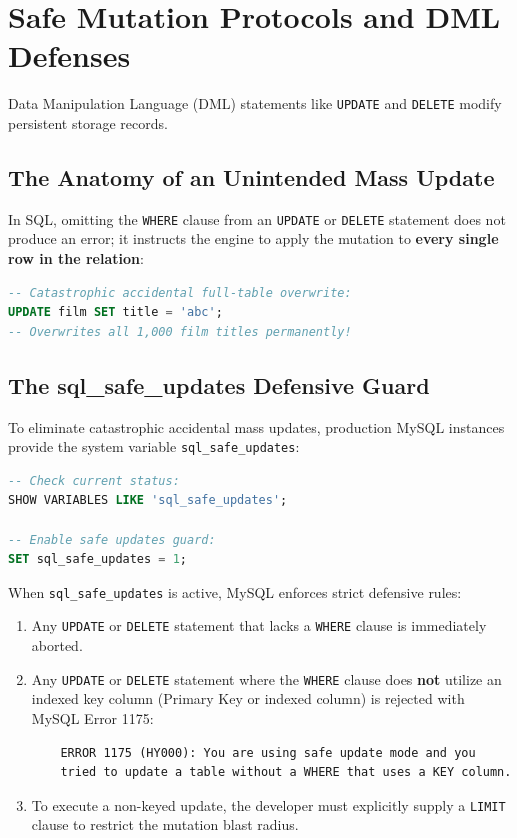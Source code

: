 \documentclass[10pt,journal,compsoc,onecolumn]{IEEEtran}
\begin{document}
\section{Safe Mutation Protocols and DML Defenses}
\label{sec:safe_mutations}

Data Manipulation Language (DML) statements like \texttt{UPDATE} and \texttt{DELETE} modify persistent storage records. 

\subsection{The Anatomy of an Unintended Mass Update}
In SQL, omitting the \texttt{WHERE} clause from an \texttt{UPDATE} or \texttt{DELETE} statement does not produce an error; it instructs the engine to apply the mutation to \textbf{every single row in the relation}:
\begin{lstlisting}[language=SQL]
-- Catastrophic accidental full-table overwrite:
UPDATE film SET title = 'abc'; 
-- Overwrites all 1,000 film titles permanently!
\end{lstlisting}

\subsection{The sql\_safe\_updates Defensive Guard}
To eliminate catastrophic accidental mass updates, production MySQL instances provide the system variable \texttt{sql\_safe\_updates}:
\begin{lstlisting}[language=SQL]
-- Check current status:
SHOW VARIABLES LIKE 'sql_safe_updates';

-- Enable safe updates guard:
SET sql_safe_updates = 1;
\end{lstlisting}

When \texttt{sql\_safe\_updates} is active, MySQL enforces strict defensive rules:
\begin{enumerate}
    \item Any \texttt{UPDATE} or \texttt{DELETE} statement that lacks a \texttt{WHERE} clause is immediately aborted.
    \item Any \texttt{UPDATE} or \texttt{DELETE} statement where the \texttt{WHERE} clause does \textbf{not} utilize an indexed key column (Primary Key or indexed column) is rejected with MySQL Error 1175:
    \begin{verbatim}
    ERROR 1175 (HY000): You are using safe update mode and you 
    tried to update a table without a WHERE that uses a KEY column.
    \end{verbatim}
    \item To execute a non-keyed update, the developer must explicitly supply a \texttt{LIMIT} clause to restrict the mutation blast radius.
\end{enumerate}
\end{document}
